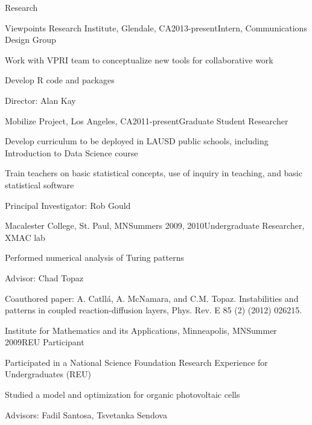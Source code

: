 \documentclass{resume} %
\begin{document}
\begin{rSection}{Research}

\begin{rSubsection}{Viewpoints Research Institute, }{Glendale, CA}{2013-present}{Intern, Communications Design Group}
\item Work with VPRI team to conceptualize new tools for collaborative work
\item Develop R code and packages
\item Director: Alan Kay
\end{rSubsection}


\begin{rSubsection}{Mobilize Project, }{Los Angeles, CA}{2011-present}{Graduate Student Researcher}
\item Develop curriculum to be deployed in LAUSD public schools, including Introduction to Data Science course
\item Train teachers on basic statistical concepts, use of inquiry in teaching, and basic statistical software
\item Principal Investigator: Rob Gould
\end{rSubsection}


\begin{rSubsection}{Macalester College, }{St. Paul, MN}{Summers 2009, 2010}{Undergraduate Researcher, XMAC lab}
\item Performed numerical analysis of Turing patterns
\item Advisor: Chad Topaz
\item Coauthored paper: A. Catll{\'a}, A. McNamara, and C.M. Topaz. Instabilities and patterns in coupled reaction-diffusion layers, Phys. Rev. E 85 (2) (2012) 026215.
\end{rSubsection}


\begin{rSubsection}{Institute for Mathematics and its Applications, }{Minneapolis, MN}{Summer 2009}{REU Participant}
\item Participated in a National Science Foundation Research Experience for Undergraduates (REU)
\item Studied a model and optimization for organic photovoltaic cells
\item Advisors: Fadil Santosa, Tsvetanka Sendova
\end{rSubsection}

\end{rSection}
\end{document}
